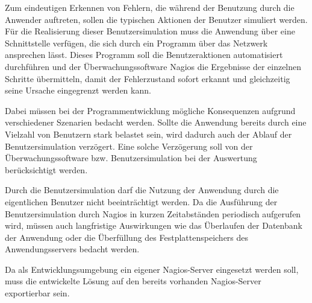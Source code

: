 Zum eindeutigen Erkennen von Fehlern, die während der Benutzung durch die Anwender auftreten, sollen die typischen Aktionen der Benutzer simuliert werden. 
Für die Realisierung dieser Benutzersimulation muss die Anwendung über eine Schnittstelle verfügen, die sich durch ein Programm über das Netzwerk ansprechen lässt.
Dieses Programm soll die Benutzeraktionen automatisiert durchführen und der Überwachungssoftware Nagios die Ergebnisse der einzelnen Schritte übermitteln, damit der Fehlerzustand sofort erkannt und gleichzeitig seine Ursache eingegrenzt werden kann.

Dabei müssen bei der Programmentwicklung mögliche Konsequenzen aufgrund verschiedener Szenarien bedacht werden.
Sollte die Anwendung bereits durch eine Vielzahl von Benutzern stark belastet sein, wird dadurch auch der Ablauf der Benutzersimulation verzögert.
Eine solche Verzögerung soll von der Überwachungssoftware bzw. Benutzersimulation bei der Auswertung berücksichtigt werden.

Durch die Benutzersimulation darf die Nutzung der Anwendung durch die eigentlichen Benutzer nicht beeinträchtigt werden.
Da die Ausführung der Benutzersimulation durch Nagios in kurzen Zeitabständen periodisch aufgerufen wird, müssen auch langfristige Auswirkungen wie das Überlaufen der Datenbank der Anwendung oder die Überfüllung des Festplattenspeichers des Anwendungsservers bedacht werden.

Da als Entwicklungsumgebung ein eigener Nagios-Server eingesetzt werden soll, muss die entwickelte Lösung auf den bereits vorhanden Nagios-Server exportierbar sein.


